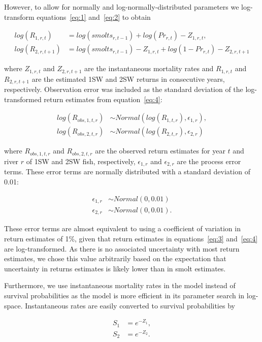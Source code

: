 \documentclass[12pt]{article}
\begin{document}
However, to allow for normally and log-normally-distributed parameters we
log-transform equations~\ref{eq:1} and~\ref{eq:2} to obtain

\begin{align}
    log(R_{1,r,t}) &= log(smolts_{r,t-1}) + log(Pr_{r,t}) - Z_{1,r,t} \label{eq:3}, \\
    log(R_{2,r,t+1}) &= log(smolts_{r,t-1}) - Z_{1,r,t} + log(1 - Pr_{r,t})  - Z_{2,r,t+1} \label{eq:4} 
\end{align}

where $Z_{1,r,t}$ and $Z_{2,r,t+1}$ are the instantaneous mortality rates and
$R_{1,r,t}$ and $R_{2,r,t+1}$ are the estimated 1SW and 2SW returns in
consecutive years, respectively. Observation error was included as the
standard deviation of the log-transformed return estimates from
equation~\ref{eq:4}:

\begin{align}
log(R_{obs,1,t,r}) &\sim Normal(log(R_{1,t,r}), \epsilon_{1,r}), \\
log(R_{obs,2,t,r}) &\sim Normal(log(R_{2,t,r}), \epsilon_{2,r}) \label{eq:5} 
\end{align}

where $R_{obs,1,t,r}$ and $R_{obs,2,t,r}$ are the observed return estimates
for year $t$ and river $r$ of 1SW and 2SW fish, respectively, $\epsilon_{1,r}$
and $\epsilon_{2,r}$ are the process error terms. 
These error terms are normally distributed with a standard deviation
of 0.01:

\begin{align}
\epsilon_{1,r} &\sim Normal(0, 0.01) \\
\epsilon_{2,r} &\sim Normal(0, 0.01).
\end{align}

These error terms are almost equivalent to using a coefficient of variation in
return estimates of 1\%, given that return estimates in equations~\ref{eq:3}
and~\ref{eq:4} are log-transformed. As
there is no associated uncertainty with most return estimates, we chose this value arbitrarily
based on the expectation that uncertainty in returns estimates is likely lower than in
smolt estimates.

Furthermore, we use instantaneous mortality rates in the model instead of
survival probabilities as the model is more efficient in its parameter search
in log-space. Instantaneous rates are easily converted to survival
probabilities by 

\begin{align}
 S_{1} &= e^{-Z_1}, \\
 S_{2} &= e^{-Z_2}. 
\end{align}
\end{document}
